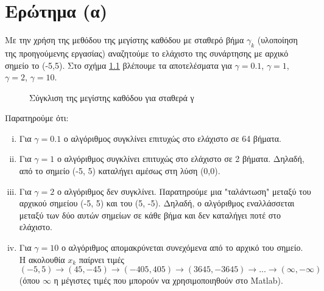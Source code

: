 \chapter{Ερώτημα (α)}


Με την χρήση της μεθόδου της μεγίστης καθόδου με σταθερό βήμα $\gamma_k$ (υλοποίηση της προηγούμενης εργασίας) 
αναζητούμε το ελάχιστο της συνάρτησης με αρχικό σημείο το (-5,5).
Στο σχήμα \ref{fig:stepeest_plots} βλέπουμε τα αποτελέσματα για $\gamma = 0.1$, $\gamma = 1$, $\gamma = 2$, $\gamma = 10$.

\begin{figure}[hbtp]
	\centering
	\setlength\figureheight{\textwidth}
	\setlength\figurewidth{\textwidth}
%	
	\caption{Σύγκλιση της μεγίστης καθόδου για σταθερά γ}
	\label{fig:stepeest_plots}
\end{figure}

\noindent \begin{minipage}{\linewidth}
\noindent Παρατηρούμε ότι:
\begin{enumerate}[i)]
	\item Για $\gamma = 0.1$ ο αλγόριθμος συγκλίνει επιτυχώς στο ελάχιστο σε 64 βήματα.
	\item Για $\gamma = 1$ ο αλγόριθμος συγκλίνει επιτυχώς στο ελάχιστο σε 2 βήματα. Δηλαδή, από το σημείο (-5, 5) καταλήγει αμέσως στη λύση (0,0).
	\item Για $\gamma = 2$ ο αλγόριθμος δεν συγκλίνει. Παρατηρούμε μια "ταλάντωση" μεταξύ του αρχικού σημείου (-5, 5) και του (5, -5). Δηλαδή, ο αλγόριθμος εναλλάσσεται μεταξύ των δύο αυτών σημείων σε κάθε βήμα και δεν καταλήγει ποτέ στο ελάχιστο.
	\item Για $\gamma = 10$ ο αλγόριθμος απομακρύνεται συνεχόμενα από το αρχικό του σημείο. Η ακολουθία $x_k$ παίρνει τιμές $(-5, 5) \rightarrow (45, -45) \rightarrow (-405, 405) \rightarrow (3645, -3645) \rightarrow ... \rightarrow (\infty, -\infty)$ (όπου $\infty$ η μέγιστες τιμές που μπορούν να χρησιμοποιηθούν στο Matlab).
\end{enumerate}
\end{minipage}

